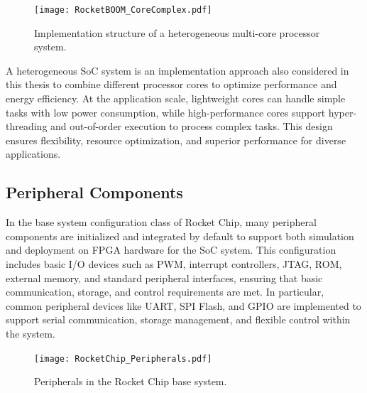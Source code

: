 
\begin{figure}[h!]
    \centering
    \texttt{[image: RocketBOOM\_CoreComplex.pdf]} %
    \caption{Implementation structure of a heterogeneous multi-core processor system.}
    \label{fig:heterogeneous_cores_system}
\end{figure}

A heterogeneous SoC system is an implementation approach also considered in this thesis to combine different processor cores to optimize performance and energy efficiency. At the application scale, lightweight cores can handle simple tasks with low power consumption, while high-performance cores support hyper-threading and out-of-order execution to process complex tasks. This design ensures flexibility, resource optimization, and superior performance for diverse applications.

\subsection{Peripheral Components}
\label{subsec:peripheral_components}

In the base system configuration class of Rocket Chip, many peripheral components are initialized and integrated by default to support both simulation and deployment on FPGA hardware for the SoC system. This configuration includes basic I/O devices such as PWM, interrupt controllers, JTAG, ROM, external memory, and standard peripheral interfaces, ensuring that basic communication, storage, and control requirements are met. In particular, common peripheral devices like UART, SPI Flash, and GPIO are implemented to support serial communication, storage management, and flexible control within the system.

\begin{figure}[h!]
    \centering
    \texttt{[image: RocketChip\_Peripherals.pdf]}
    \caption{Peripherals in the Rocket Chip base system.}
    \label{fig:rocketchip_base_peripherals}
\end{figure}


